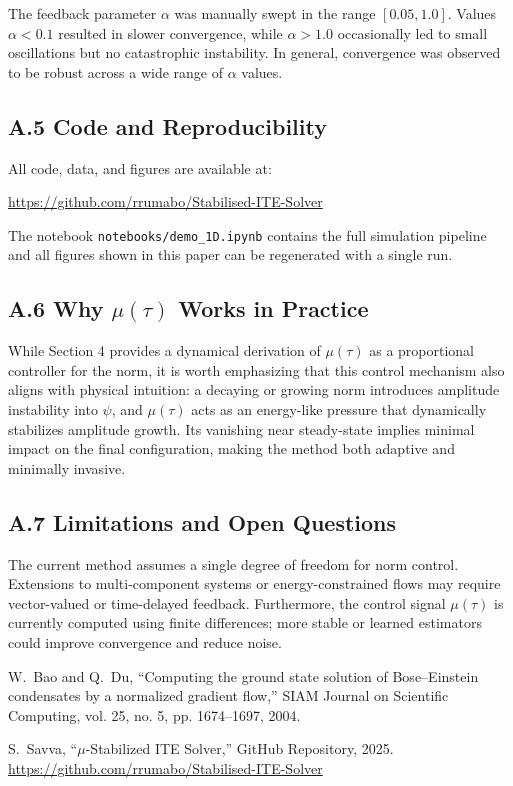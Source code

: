 \documentclass[12pt]{article}
\begin{document}
The feedback parameter $\alpha$ was manually swept in the range $[0.05, 1.0]$. Values $\alpha < 0.1$ resulted in slower convergence, while $\alpha > 1.0$ occasionally led to small oscillations but no catastrophic instability. In general, convergence was observed to be robust across a wide range of $\alpha$ values.

\subsection*{A.5 Code and Reproducibility}

All code, data, and figures are available at:

\begin{center}
\url{https://github.com/rrumabo/Stabilised-ITE-Solver}
\end{center}

The notebook \texttt{notebooks/demo\_1D.ipynb} contains the full simulation pipeline and all figures shown in this paper can be regenerated with a single run.

\subsection*{A.6 Why $\mu(\tau)$ Works in Practice}

While Section 4 provides a dynamical derivation of $\mu(\tau)$ as a proportional controller for the norm, it is worth emphasizing that this control mechanism also aligns with physical intuition: a decaying or growing norm introduces amplitude instability into $\psi$, and $\mu(\tau)$ acts as an energy-like pressure that dynamically stabilizes amplitude growth. Its vanishing near steady-state implies minimal impact on the final configuration, making the method both adaptive and minimally invasive.

\subsection*{A.7 Limitations and Open Questions}

The current method assumes a single degree of freedom for norm control. Extensions to multi-component systems or energy-constrained flows may require vector-valued or time-delayed feedback. Furthermore, the control signal $\mu(\tau)$ is currently computed using finite differences; more stable or learned estimators could improve convergence and reduce noise.

\begin{thebibliography}{9}

W.~Bao and Q.~Du,
``Computing the ground state solution of Bose–Einstein condensates by a normalized gradient flow,''
SIAM Journal on Scientific Computing, vol. 25, no. 5, pp. 1674–1697, 2004.

S.~Savva, ``$\mu$-Stabilized ITE Solver,'' GitHub Repository, 2025.
\url{https://github.com/rrumabo/Stabilised-ITE-Solver}

\end{thebibliography}
\end{document}
